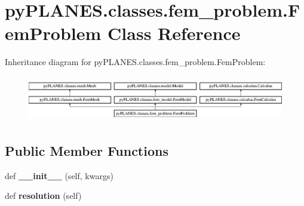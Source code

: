 \hypertarget{classpy_p_l_a_n_e_s_1_1classes_1_1fem__problem_1_1_fem_problem}{}\section{py\+P\+L\+A\+N\+E\+S.\+classes.\+fem\+\_\+problem.\+Fem\+Problem Class Reference}
\label{classpy_p_l_a_n_e_s_1_1classes_1_1fem__problem_1_1_fem_problem}
Inheritance diagram for py\+P\+L\+A\+N\+E\+S.\+classes.\+fem\+\_\+problem.\+Fem\+Problem\+:\begin{figure}[H]
\begin{center}
\leavevmode
\includegraphics[height=2.007169cm]{classpy_p_l_a_n_e_s_1_1classes_1_1fem__problem_1_1_fem_problem}
\end{center}
\end{figure}
\subsection*{Public Member Functions}
\begin{DoxyCompactItemize}
\item 
\mbox{\label{classpy_p_l_a_n_e_s_1_1classes_1_1fem__problem_1_1_fem_problem_a95c28bb0f21dd60d3df0196bff6a09ed}} 
def {\bfseries \+\_\+\+\_\+init\+\_\+\+\_\+} (self, kwargs)
\item 
\mbox{\label{classpy_p_l_a_n_e_s_1_1classes_1_1fem__problem_1_1_fem_problem_aa27a7d9c65a5e6e7b86ca6aade2342ef}} 
def {\bfseries resolution} (self)
\end{DoxyCompactItemize}
